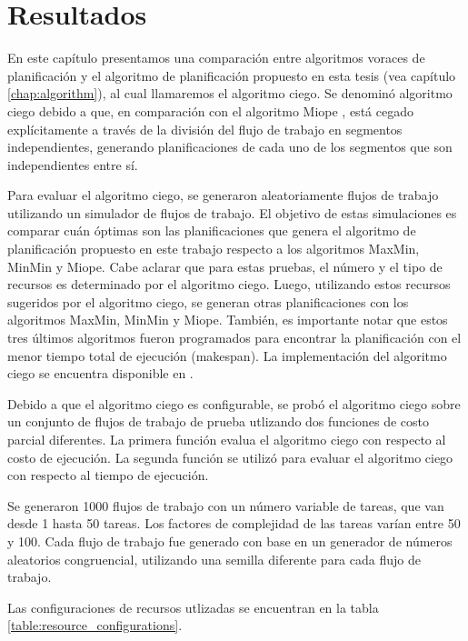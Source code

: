 \chapter{Resultados}
\label{chap:results}


En este capítulo presentamos una comparación entre algoritmos voraces de planificación y el algoritmo de planificación propuesto en esta tesis (vea capítulo \ref{chap:algorithm}), al cual llamaremos el algoritmo ciego. Se denominó algoritmo ciego debido a que, en comparación con el algoritmo Miope \cite{ramamritham1990efficient}, está cegado explícitamente a través de la división del flujo de trabajo en segmentos independientes, generando planificaciones de cada uno de los segmentos que son independientes entre sí.

Para evaluar el algoritmo ciego, se generaron aleatoriamente flujos de trabajo utilizando un simulador de flujos de trabajo. El objetivo de estas simulaciones es comparar cuán óptimas son las planificaciones que genera el algoritmo de planificación propuesto en este trabajo respecto a los algoritmos MaxMin, MinMin y Miope. Cabe aclarar que para estas pruebas, el número y el tipo de recursos es determinado por el algoritmo ciego. Luego, utilizando estos recursos sugeridos por el algoritmo ciego, se generan otras planificaciones con los algoritmos MaxMin, MinMin y Miope. También, es importante notar que estos tres \'ultimos algoritmos fueron programados para encontrar la planificación con el menor tiempo total de ejecución (makespan). La implementaci\'on del algoritmo ciego se encuentra disponible en \cite{dominofire2014workflowsimulator}.

Debido a que el algoritmo ciego es configurable, se prob\'o el algoritmo ciego sobre un conjunto de flujos de trabajo de prueba utlizando dos funciones de costo parcial diferentes. La primera funci\'on evalua el algoritmo ciego con respecto al costo de ejecución. La segunda funci\'on se utiliz\'o para evaluar el algoritmo ciego con respecto al tiempo de ejecuci\'on.

Se generaron 1000 flujos de trabajo con un número variable de tareas, que van desde 1 hasta 50 tareas. Los factores de complejidad de las tareas varían entre 50 y 100. Cada flujo de trabajo fue generado con base en un generador de números aleatorios congruencial, utilizando una semilla diferente para cada flujo de trabajo.

Las configuraciones de recursos utlizadas se encuentran en la tabla \ref{table:resource_configurations}.

